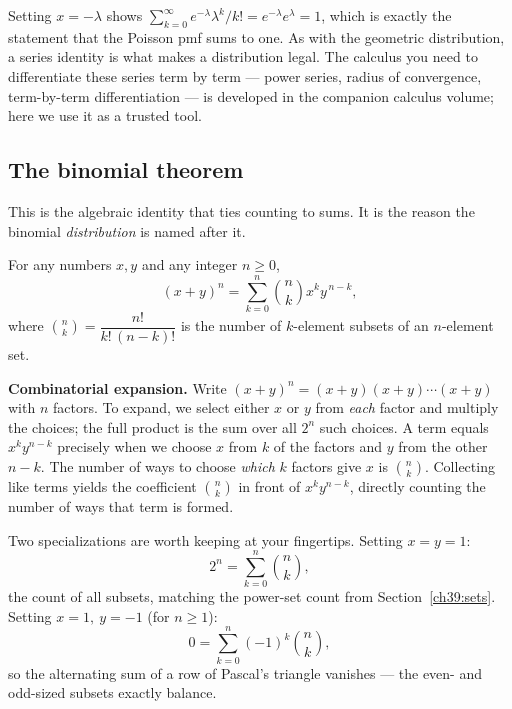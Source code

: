 \begin{connectionbox}
Setting $x = -\lambda$ shows $\sum_{k=0}^\infty e^{-\lambda}\lambda^k/k! =
e^{-\lambda}e^{\lambda} = 1$, which is exactly the statement that the Poisson
pmf sums to one. As with the geometric distribution, a series identity is what
makes a distribution legal. The calculus you need to differentiate these
series term by term --- power series, radius of convergence, term-by-term
differentiation --- is developed in the companion calculus volume; here we use
it as a trusted tool.
\end{connectionbox}

\subsection{The binomial theorem}

This is the algebraic identity that ties counting to sums. It is the reason
the binomial \emph{distribution} is named after it.

\begin{theorem}
\label{ch39:binom}
For any numbers $x, y$ and any integer $n \ge 0$,
\[
  (x + y)^{n} = \sum_{k=0}^{n} \binom{n}{k} x^{k} y^{\,n-k},
\]
where $\binom{n}{k} = \dfrac{n!}{k!\,(n-k)!}$ is the number of $k$-element
subsets of an $n$-element set.
\end{theorem}

\begin{whybox}
\textbf{Combinatorial expansion.} Write $(x+y)^n = (x+y)(x+y)\cdots(x+y)$ with
$n$ factors. To expand, we select either $x$ or $y$ from \emph{each} factor
and multiply the choices; the full product is the sum over all $2^n$ such
choices. A term equals $x^k y^{n-k}$ precisely when we choose $x$ from $k$ of
the factors and $y$ from the other $n-k$. The number of ways to choose
\emph{which} $k$ factors give $x$ is $\binom{n}{k}$. Collecting like terms
yields the coefficient $\binom{n}{k}$ in front of $x^k y^{n-k}$, directly
counting the number of ways that term is formed.
\end{whybox}

Two specializations are worth keeping at your fingertips. Setting $x = y = 1$:
\[
  2^{n} = \sum_{k=0}^{n}\binom{n}{k},
\]
the count of all subsets, matching the power-set count from
Section~\ref{ch39:sets}. Setting $x = 1,\ y = -1$ (for $n \ge 1$):
\[
  0 = \sum_{k=0}^{n}(-1)^{k}\binom{n}{k},
\]
so the alternating sum of a row of Pascal's triangle vanishes --- the even-
and odd-sized subsets exactly balance.

